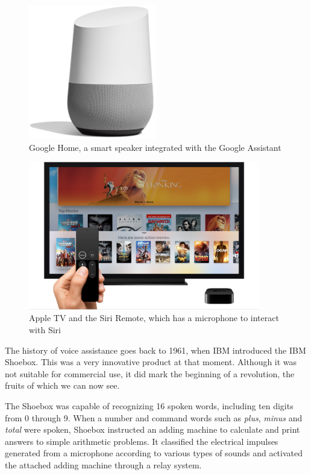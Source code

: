 \begin{figure}
	\centering
	\includegraphics[width=0.5\textwidth]{images/Chapter_03/google-home.png}
	\caption{Google Home, a smart speaker integrated with the Google Assistant}
	\label{fig:google-home}
\end{figure}

\begin{figure}
	\centering
	\includegraphics[width=0.9\textwidth]{images/Chapter_03/apple-tv.jpg}
	\caption{Apple TV and the Siri Remote, which has a microphone to interact with Siri}
	\label{fig:apple-tv}
\end{figure}

The history of voice assistance goes back to 1961, when IBM introduced the IBM Shoebox.\cite{voicebotTimeline} 
This was a very innovative product at that moment. Although it was not suitable for commercial use, it did mark the 
beginning of a revolution, the fruits of which we can now see. 

The Shoebox was capable of recognizing 16 spoken words, including ten digits from 0 through 9. When a number and 
command words such as \textit{plus}, \textit{minus} and \textit{total} were spoken, Shoebox instructed an adding machine 
to calculate and print answers to simple arithmetic problems. It classified the electrical impulses generated from a microphone
according to various types of sounds and activated the attached adding machine through a relay system.\cite{ibmArchivesShoebox}

